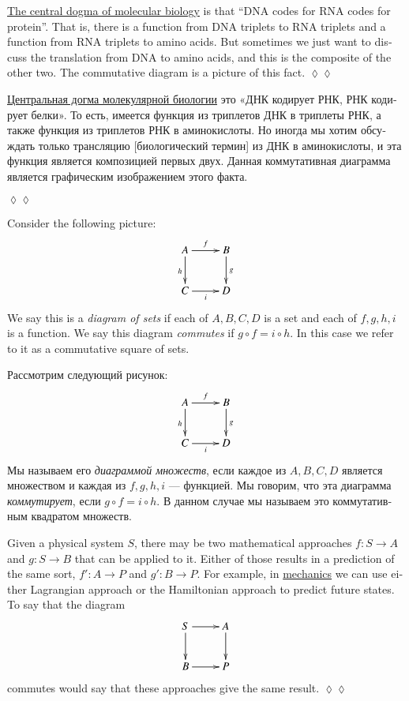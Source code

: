 \documentclass[a4paper]{book}
\def\to{\rightarrow}
\def\taking{\colon}
\theoremstyle{myth}
\newtheorem{appENG}[envENG]{\begin{english}Application\end{english}}
\newenvironment{applicationENG}{\begin{appENG}}{\hspace*{\fill}$\lozenge\lozenge$\end{appENG}}
\newtheorem{appRUS}[envRUS]{\begin{russian}Прикладной пример (применение)\end{russian}}
\newenvironment{applicationRUS}{\begin{appRUS}}{\hspace*{\fill}$\lozenge\lozenge$\end{appRUS}}
\begin{document}
\begin{english}
\begin{applicationENG}
\href{http://en.wikipedia.org/wiki/Central_dogma_of_molecular_biology}{\text The central dogma of molecular biology} is that “DNA codes for RNA codes for protein”. That is, there is a function from DNA triplets to RNA triplets and a function from RNA triplets to amino acids. But sometimes we just want to discuss the translation from DNA to amino acids, and this is the composite of the other two. The commutative diagram is a picture of this fact.
\end{applicationENG}

\begin{applicationRUS}
\begin{russian}
\href{https://ru.wikipedia.org/wiki/%D0%A6%D0%B5%D0%BD%D1%82%D1%80%D0%B0%D0%BB%D1%8C%D0%BD%D0%B0%D1%8F_%D0%B4%D0%BE%D0%B3%D0%BC%D0%B0_%D0%BC%D0%BE%D0%BB%D0%B5%D0%BA%D1%83%D0%BB%D1%8F%D1%80%D0%BD%D0%BE%D0%B9_%D0%B1%D0%B8%D0%BE%D0%BB%D0%BE%D0%B3%D0%B8%D0%B8}{\text Центральная догма молекулярной биологии} это «ДНК кодирует РНК, РНК кодирует белки». То есть, имеется функция из триплетов ДНК в триплеты РНК, а также функция из триплетов РНК в аминокислоты. Но иногда мы хотим обсуждать только трансляцию [биологический термин] из ДНК в аминокислоты, и эта функция является композицией первых двух. Данная коммутативная диаграмма является графическим изображением этого факта.
\end{russian}
\end{applicationRUS}

Consider the following picture:
$$\xymatrix{A\ar[r]^f\ar[d]_h&B\ar[d]^g\\C\ar[r]_i&D}$$
We say this is a {\em diagram of sets} if each of $A,B,C,D$ is a set and each of $f,g,h,i$ is a function. We say this diagram {\em commutes} if $g\circ f=i\circ h$. In this case we refer to it as a commutative square of sets.

\begin{russian} 
Рассмотрим следующий рисунок:
$$\xymatrix{A\ar[r]^f\ar[d]_h&B\ar[d]^g\\C\ar[r]_i&D}$$
Мы называем его {\em диаграммой множеств}, если каждое из $A,B,C,D$ является множеством и каждая из $f,g,h,i$ — функцией. Мы говорим, что эта диаграмма {\em коммутирует}, если $g\circ f=i\circ h$. В данном случае мы называем это коммутативным квадратом множеств.
\end{russian}

\begin{applicationENG}
Given a physical system $S$, there may be two mathematical approaches $f\taking S\to A$ and $g\taking S\to B$ that can be applied to it. Either of those results in a prediction of the same sort, $f'\taking A\to P$ and $g'\taking B\to P$. For example, in \href{http://en.wikipedia.org/wiki/Hamiltonian_mechanics#As_a_reformulation_of_Lagrangian_mechanics}{\text mechanics} we can use either Lagrangian approach or the Hamiltonian approach to predict future states. To say that the diagram 
$$
\xymatrix{S\ar[r]\ar[d]&A\ar[d]\\B\ar[r]&P}
$$
commutes would say that these approaches give the same result.
\end{applicationENG}


\end{english}
\end{document}
